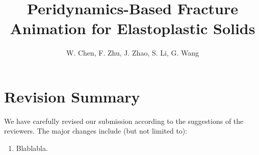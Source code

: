 

\title[Peridynamics-Based Fracture Animation for Elastoplastic Solids]%
      {Peridynamics-Based Fracture Animation for Elastoplastic Solids}

\author[W. Chen et al.]{W. Chen, F. Zhu, J. Zhao,
  S. Li, G. Wang}



%



\maketitle

\section{Revision Summary}

We have carefully revised our submission according to the suggestions of the reviewers. The major changes include (but not limited to):
\begin{enumerate}
\item{Blablabla.}
\end{enumerate}

